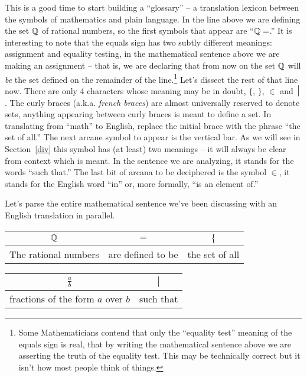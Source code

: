 This is a good time to start building a ``glossary'' -- a translation lexicon
between the symbols of mathematics and plain language.  In the line
above we are defining the set ${\mathbb Q}$ of rational numbers, so the
first symbols that appear are ``${\mathbb Q} =$.''  It is interesting to 
note that the equals sign has two subtly different meanings: assignment
and equality testing,  in the mathematical sentence above we are
making an assignment -- that is, we are declaring that from now on the set
${\mathbb Q}$ will {\em be} the set defined on the remainder of the
line.\footnote{Some Mathematicians contend that only the ``equality
  test'' meaning of the equals sign is real, that by writing the
  mathematical sentence above we are asserting the truth of the
  equality test.  This may be technically correct but it isn't how
  most people think of things.}  
Let's dissect the rest of that line now.  There are only 4 
characters whose meaning may be in doubt, $\{$, $\}$, $\in$ and $\suchthat$.
The curly braces (a.k.a. {\em french braces}) are almost universally
reserved to denote sets, anything appearing between curly braces is 
meant to define a set.  In translating from ``math'' to English,
replace the initial brace with the phrase ``the set of all.''  The 
next arcane symbol to appear is the vertical bar.  As we will see in
Section~\ref{div} this symbol has (at least) two meanings -- it will
always be clear from context which is meant.  In the sentence we are
analyzing, it stands for the words ``such that.''  The last bit of
arcana to be deciphered is the symbol $\in$, it stands for the English
word ``in'' or, more formally, ``is an element of.''

Let's parse the entire mathematical sentence we've been discussing
with an English translation in parallel.

\vspace{.2in}

\begin{tabular}{c|c|c}
\rule[-10pt]{0pt}{22pt} ${\mathbb Q}$ & $=$ & $\{$  \\ \hline
\rule[-6pt]{0pt}{22pt} The rational numbers & are defined to be & the set of all\\
\end{tabular}

\vspace{.2in}

\begin{tabular}{c|c}
\rule[-10pt]{0pt}{22pt} $\displaystyle \frac{a}{b}$ & $\suchthat$ \\ \hline
\rule[-6pt]{0pt}{22pt} fractions of the form $a$ over $b$ & such that \\
\end{tabular}

